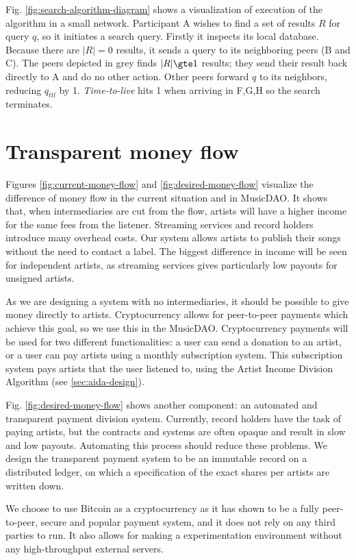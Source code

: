 Fig. \ref{fig:search-algorithm-diagram} shows a visualization of execution of the algorithm in a small network. Participant A wishes to find a set of results $R$ for query $q$, so it initiates a search query. Firstly it inspects its local database. Because there are $|R|=0$ results, it sends a query to its neighboring peers (B and C). The peers depicted in grey finds $|R|\gte 1$ results; they send their result back directly to A and do no other action. Other peers forward $q$ to its neighbors, reducing $q_{ttl}$ by 1. \textit{Time-to-live} hits 1 when arriving in F,G,H so the search terminates. 

\section{Transparent money flow}
Figures \ref{fig:current-money-flow} and \ref{fig:desired-money-flow} visualize the difference of money flow in the current situation and in MusicDAO. It shows that, when intermediaries are cut from the flow, artists will have a higher income for the same fees from the listener. Streaming services and record holders introduce many overhead costs. Our system allows artists to publish their songs without the need to contact a label. The biggest difference in income will be seen for independent artists, as streaming services gives particularly low payouts for unsigned artists.

As we are designing a system with no intermediaries, it should be possible to give money directly to artists. Cryptocurrency allows for peer-to-peer payments which achieve this goal, so we use this in the MusicDAO. Cryptocurrency payments will be used for two different functionalities: a user can send a donation to an artist, or a user can pay artists using a monthly subscription system. This subscription system pays artists that the user listened to, using the Artist Income Division Algorithm (see \ref{sec:aida-design}). 

Fig. \ref{fig:desired-money-flow} shows another component: an automated and transparent payment division system. Currently, record holders have the task of paying artists, but the contracts and systems are often opaque and result in slow and low payouts. Automating this process should reduce these problems. We design the transparent payment system to be an immutable record on a distributed ledger, on which a specification of the exact shares per artists are written down.

We choose to use Bitcoin as a cryptocurrency as it has shown to be a fully peer-to-peer, secure and popular payment system, and it does not rely on any third parties to run. It also allows for making a experimentation environment without any high-throughput external servers. 

